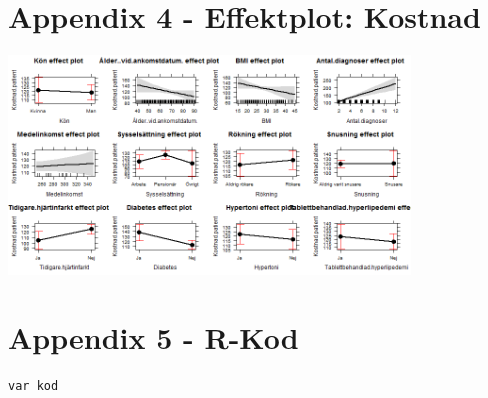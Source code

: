 \section{Appendix 4 - Effektplot: Kostnad}
\noindent\begin{minipage}{\textwidth}

\centering
\includegraphics[width=0.8\textwidth]{effektkostnad.png}
\end{minipage} 
\newpage
\section{Appendix 5 - R-Kod}
\begin{lstlisting}[language=R]
var kod
\end{lstlisting}
\newpage
\restoregeometry


%

